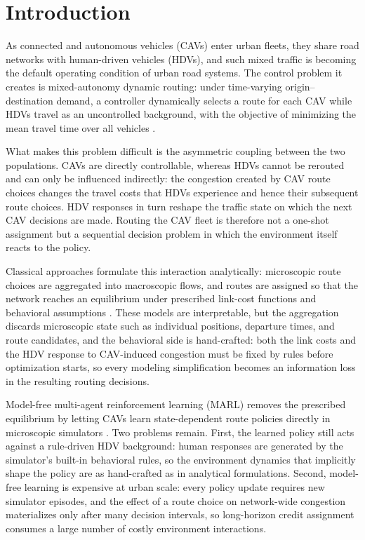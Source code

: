 \section{Introduction}

As connected and autonomous vehicles (CAVs) enter urban fleets, they share road networks with human-driven vehicles (HDVs), and such mixed traffic is becoming the default operating condition of urban road systems. The control problem it creates is mixed-autonomy dynamic routing: under time-varying origin--destination demand, a controller dynamically selects a route for each CAV while HDVs travel as an uncontrolled background, with the objective of minimizing the mean travel time over all vehicles \cite{calderone2017markov,lazar2020routing}.

What makes this problem difficult is the asymmetric coupling between the two populations. CAVs are directly controllable, whereas HDVs cannot be rerouted and can only be influenced indirectly: the congestion created by CAV route choices changes the travel costs that HDVs experience and hence their subsequent route choices. HDV responses in turn reshape the traffic state on which the next CAV decisions are made. Routing the CAV fleet is therefore not a one-shot assignment but a sequential decision problem in which the environment itself reacts to the policy.

Classical approaches formulate this interaction analytically: microscopic route choices are aggregated into macroscopic flows, and routes are assigned so that the network reaches an equilibrium under prescribed link-cost functions and behavioral assumptions \cite{tanaka2020linearly,cabannes2022solving,kolarich2022stackelberg}. These models are interpretable, but the aggregation discards microscopic state such as individual positions, departure times, and route candidates, and the behavioral side is hand-crafted: both the link costs and the HDV response to CAV-induced congestion must be fixed by rules before optimization starts, so every modeling simplification becomes an information loss in the resulting routing decisions.

Model-free multi-agent reinforcement learning (MARL) removes the prescribed equilibrium by letting CAVs learn state-dependent route policies directly in microscopic simulators \cite{lazar2021learning,shou2022multi,akman2025routerl,akman2026urb}. Two problems remain. First, the learned policy still acts against a rule-driven HDV background: human responses are generated by the simulator's built-in behavioral rules, so the environment dynamics that implicitly shape the policy are as hand-crafted as in analytical formulations. Second, model-free learning is expensive at urban scale: every policy update requires new simulator episodes, and the effect of a route choice on network-wide congestion materializes only after many decision intervals, so long-horizon credit assignment consumes a large number of costly environment interactions.

